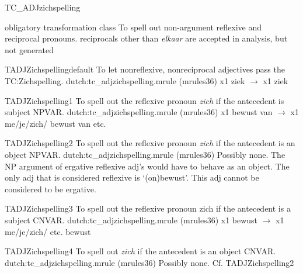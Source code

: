 \newpage
\begin{mruleclass}{TC\_ADJzichspelling}
\begin{classdescr}
\kind obligatory transformation class
\classtask To spell out non-argument reflexive and reciprocal pronouns.
\classremarks
reciprocals other than {\em elkaar} are accepted in analysis, but not generated

\nofilters

\nospeedrules

\noplannedrules

\norulesnotince
\end{classdescr}

\begin{members}
\begin{member}
 TADJZichspellingdefault
  To let nonreflexive, nonreciprocal adjectives pass the
TC:Zichspelling. 
\file dutch:tc\_adjzichspelling.mrule (mrules36)
\semantics \nosemantics
\example x1 ziek $\rightarrow$ x1 ziek  
\remarks\mbox{}

\end{member}
\begin{member}
 TADJZichspelling1
 To spell out the reflexive pronoun {\em zich} if the antecedent is 
subject NPVAR.
\file dutch:tc\_adjzichspelling.mrule (mrules36)
\semantics \nosemantics
\example 
x1 bewust van $\rightarrow$  x1 me/je/zich/ bewust van etc. 
\remarks\mbox{}

\end{member}
\begin{member}
 TADJZichspelling2
 To spell out the reflexive pronoun {\em zich} if the antecedent
is an object NPVAR. 
\file dutch:tc\_adjzichspelling.mrule (mrules36)
\semantics \nosemantics
\example Possibly none. 
The NP argument of ergative reflexive adj's would have to behave as 
an object. The only adj that is considered reflexive is `(on)bewust'.
This adj cannot be considered to be ergative. 
 \remarks\mbox{}

\end{member}
\begin{member}
 TADJZichspelling3
 To spell out the reflexive pronoun zich if the antecedent is a
subject CNVAR.
\file dutch:tc\_adjzichspelling.mrule (mrules36)
\semantics \nosemantics
\example x1 bewust $\rightarrow$  x1 me/je/zich/ etc. 
bewust 
\remarks\mbox{}

\end{member}
\begin{member}
 TADJZichspelling4
 To spell out {\em zich} if the antecedent is an object CNVAR.
\file dutch:tc\_adjzichspelling.mrule (mrules36)
\semantics \nosemantics
\example Possibly none. Cf. TADJZichspelling2
\remarks\mbox{}


\end{member}
\end{members}
\end{mruleclass}

